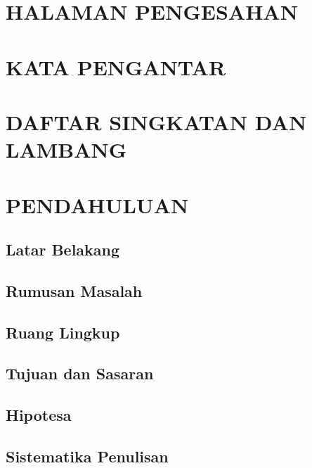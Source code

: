 \documentclass[12pt,a4paper]{report}
\begin{document}
\chapter*{HALAMAN PENGESAHAN}

\chapter*{KATA PENGANTAR}

\chapter*{DAFTAR SINGKATAN DAN LAMBANG}

\tableofcontents
\listoffigures
\listoftables

\clearpage
{}
\setcounter{page}{1}

\chapter{PENDAHULUAN}
\section{Latar Belakang}
\section{Rumusan Masalah}
\section{Ruang Lingkup}
\section{Tujuan dan Sasaran}
\section{Hipotesa}
\section{Sistematika Penulisan}
\end{document}
